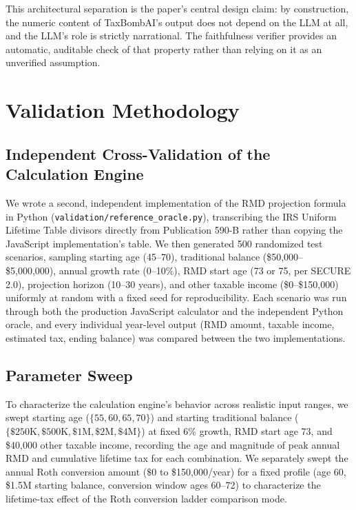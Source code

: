 \documentclass[11pt]{article}
\begin{document}
This architectural separation is the paper's central design claim: by
construction, the numeric content of TaxBombAI's output does not depend
on the LLM at all, and the LLM's role is strictly narrational. The
faithfulness verifier provides an automatic, auditable check of that
property rather than relying on it as an unverified assumption.

\section{Validation Methodology}

\subsection{Independent Cross-Validation of the Calculation Engine}

We wrote a second, independent implementation of the RMD projection
formula in Python (\texttt{validation/reference\_oracle.py}), transcribing
the IRS Uniform Lifetime Table divisors directly from Publication 590-B
rather than copying the JavaScript implementation's table. We then
generated 500 randomized test scenarios, sampling starting age (45--70),
traditional balance (\$50,000--\$5,000,000), annual growth rate
(0--10\%), RMD start age (73 or 75, per SECURE 2.0), projection horizon
(10--30 years), and other taxable income (\$0--\$150,000) uniformly at
random with a fixed seed for reproducibility. Each scenario was run
through both the production JavaScript calculator and the independent
Python oracle, and every individual year-level output (RMD amount,
taxable income, estimated tax, ending balance) was compared between the
two implementations.

\subsection{Parameter Sweep}

To characterize the calculation engine's behavior across realistic input
ranges, we swept starting age ($\{55,60,65,70\}$) and starting
traditional balance ($\{\$250\text{K}, \$500\text{K}, \$1\text{M},
\$2\text{M}, \$4\text{M}\}$) at fixed 6\% growth, RMD start age 73, and
\$40,000 other taxable income, recording the age and magnitude of peak
annual RMD and cumulative lifetime tax for each combination. We
separately swept the annual Roth conversion amount ($\$0$ to
\$150,000/year) for a fixed profile (age 60, \$1.5M starting balance,
conversion window ages 60--72) to characterize the lifetime-tax effect
of the Roth conversion ladder comparison mode.
\end{document}
